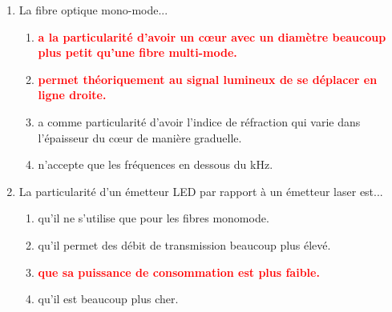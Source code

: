\documentclass[a4paper]{article}
\begin{document}
\begin{enumerate}[label=Q\arabic*.]
\item La fibre optique mono-mode...
\begin{enumerate}
    \item \textcolor{red}{\textbf{a la particularité d'avoir un cœur avec un diamètre beaucoup plus petit qu'une fibre multi-mode.}}
    \item \textcolor{red}{\textbf{permet théoriquement au signal lumineux de se déplacer en ligne droite.}}
    \item a comme particularité d'avoir l'indice de réfraction qui varie dans l'épaisseur du cœur de manière graduelle.
    \item n’accepte que les fréquences en dessous du kHz.
\end{enumerate}


\item La particularité d'un émetteur LED par rapport à un émetteur laser est...
\begin{enumerate}
    \item qu'il ne s'utilise que pour les fibres monomode.
    \item qu'il permet des débit de transmission beaucoup plus élevé.
    \item \textcolor{red}{\textbf{que sa puissance de consommation est plus faible.}}
    \item qu'il est beaucoup plus cher.
\end{enumerate}


\end{enumerate}

















\end{document}
